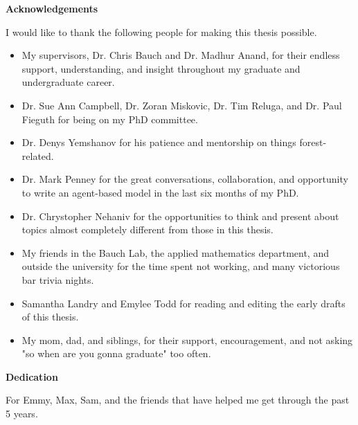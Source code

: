 \cleardoublepage


\begin{center}\textbf{Acknowledgements}\end{center}

I would like to thank the following people for making this thesis possible.

\begin{itemize}
\item My supervisors, Dr. Chris Bauch and Dr. Madhur Anand, for their endless support, understanding, and insight throughout my graduate and undergraduate career.  
  
\item Dr. Sue Ann Campbell, Dr. Zoran Miskovic, Dr. Tim Reluga, and Dr. Paul Fieguth for being on my PhD committee.

\item Dr. Denys Yemshanov for his patience and mentorship on things forest-related. 

\item Dr. Mark Penney for the great conversations, collaboration, and opportunity to write an agent-based model in the last six months of my PhD.

\item Dr. Chrystopher Nehaniv for the opportunities to think and present about topics almost completely different from those in this thesis. 

\item My friends in the Bauch Lab, the applied mathematics department, and outside the university for the time spent not working, and many victorious bar trivia nights.
 
\item Samantha Landry and Emylee Todd for reading and editing the early drafts of this thesis.

\item My mom, dad, and siblings, for their support, encouragement, and not asking "so when are you gonna graduate" too often.  
\end{itemize}

 
\cleardoublepage


\begin{center}\textbf{Dedication}\end{center}

For Emmy, Max, Sam, and the friends that have helped me get through the past 5 years.


